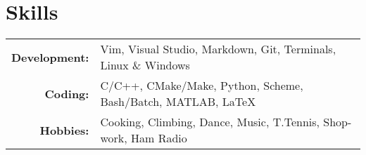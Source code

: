 \section*{\color{Blue}Skills\vspace{0.5mm}{\color{Orange}\hrule}}

\begin{tabular}{ r | l }
\textbf{Development:}   &Vim, Visual Studio, Markdown, Git, Terminals, Linux \& Windows\\
\textbf{Coding:}        &C/C++, CMake/Make, Python, Scheme, Bash/Batch, MATLAB, \LaTeX\\
\textbf{Hobbies:}       &Cooking, Climbing, Dance, Music, T.Tennis, Shop-work, Ham Radio
\end{tabular}